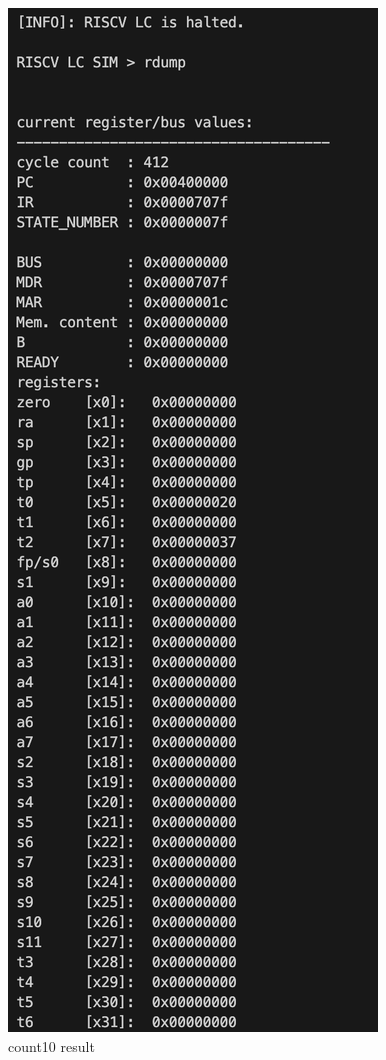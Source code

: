 \documentclass[12pt, a4paper]{article}
\begin{document}
\begin{ans}
    \begin{figure}[H]
        \caption{count10 result}
        \centering
        \includegraphics[scale=0.8]{../figs/count10-1.png}
    \end{figure}
    

\end{ans}
\end{document}
